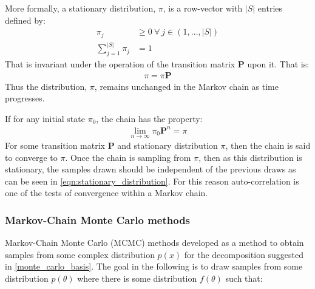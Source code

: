 \documentclass[12pt]{article} %
\begin{document}
More formally, a stationary distribution, $\pi$, is a row-vector with $|S|$ entries defined by:
\begin{align}
\pi_j &\geq 0 \: \forall \: j \in (1,\ldots,|S|) \\
\sum_{j=1}^{|S|}\pi_j &= 1
\end{align}
That is invariant under the operation of the transition matrix $\mathbf{P}$ upon it. That is:
\begin{align} \label{eqn:stationary_distribution}
\pi = \pi\mathbf{P}
\end{align}
Thus the distribution, $\pi$, remains unchanged in the Markov chain as time progresses.

If for any initial state $\pi_0$, the chain has the property:
\begin{align}
\lim_{n\to\infty} \pi_0 \mathbf{P}^n = \pi
\end{align}
For some transition matrix $\mathbf{P}$ and stationary distribution $\pi$, then the chain is said to converge to $\pi$. Once the chain is sampling from $\pi$, then as this distribution is stationary, the samples drawn should be independent of the previous draws as can be seen in \eqref{eqn:stationary_distribution}. For this reason auto-correlation is one of the tests of convergence within a Markov chain.


\subsubsection{Markov-Chain Monte Carlo methods}
Markov-Chain Monte Carlo (MCMC) methods developed as a method to obtain samples from some complex distribution $p(x)$ for the decomposition suggested in \eqref{monte_carlo_basis}. The goal in the following is to draw samples from some distribution $p(\theta)$ where there is some distribution $f(\theta)$ such that:
\end{document}
